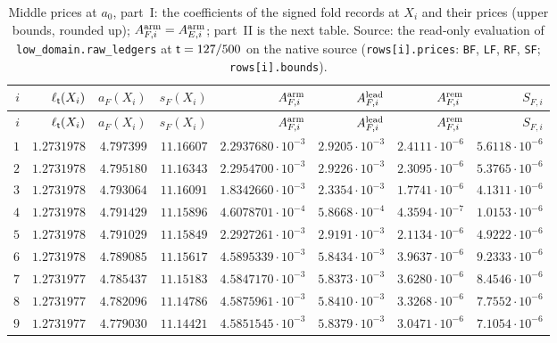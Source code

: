 {\scriptsize\setlength{\tabcolsep}{5pt}\renewcommand{\arraystretch}{0.92}
\begin{longtable}{@{}rrrrrrrr@{}}
\caption{Middle prices at $a_0$, part~I: the coefficients of the signed fold records at $X_i$ and their prices (upper bounds, rounded up); $A^{\rm arm}_{F,i}=A^{\rm arm}_{E,i}$; part~II is the next table. Source: the read-only evaluation of \texttt{low\_domain.raw\_ledgers} at $\mathsf t=127/500$ on the native source (\texttt{rows[i].prices}: \texttt{BF}, \texttt{LF}, \texttt{RF}, \texttt{SF}; \texttt{rows[i].bounds}).}\label{tab:data:prices}\\
\toprule
$i$ & $\ell_\mathsf t(X_i)$ & $a_F(X_i)$ & $s_F(X_i)$ & $A^{\rm arm}_{F,i}$ & $A^{\rm lead}_{F,i}$ & $A^{\rm rem}_{F,i}$ & $S_{F,i}$\\
\midrule
\endfirsthead
\toprule
$i$ & $\ell_\mathsf t(X_i)$ & $a_F(X_i)$ & $s_F(X_i)$ & $A^{\rm arm}_{F,i}$ & $A^{\rm lead}_{F,i}$ & $A^{\rm rem}_{F,i}$ & $S_{F,i}$\\
\midrule
\endhead
\bottomrule
\endfoot
$1$ & $1.2731978$ & $4.797399$ & $11.16607$ & $2.2937680\cdot10^{-3}$ & $2.9205\cdot10^{-3}$ & $2.4111\cdot10^{-6}$ & $5.6118\cdot10^{-6}$\\
$2$ & $1.2731978$ & $4.795180$ & $11.16343$ & $2.2954700\cdot10^{-3}$ & $2.9226\cdot10^{-3}$ & $2.3095\cdot10^{-6}$ & $5.3765\cdot10^{-6}$\\
$3$ & $1.2731978$ & $4.793064$ & $11.16091$ & $1.8342660\cdot10^{-3}$ & $2.3354\cdot10^{-3}$ & $1.7741\cdot10^{-6}$ & $4.1311\cdot10^{-6}$\\
$4$ & $1.2731978$ & $4.791429$ & $11.15896$ & $4.6078701\cdot10^{-4}$ & $5.8668\cdot10^{-4}$ & $4.3594\cdot10^{-7}$ & $1.0153\cdot10^{-6}$\\
$5$ & $1.2731978$ & $4.791029$ & $11.15849$ & $2.2927261\cdot10^{-3}$ & $2.9191\cdot10^{-3}$ & $2.1134\cdot10^{-6}$ & $4.9222\cdot10^{-6}$\\
$6$ & $1.2731978$ & $4.789085$ & $11.15617$ & $4.5895339\cdot10^{-3}$ & $5.8434\cdot10^{-3}$ & $3.9637\cdot10^{-6}$ & $9.2333\cdot10^{-6}$\\
$7$ & $1.2731977$ & $4.785437$ & $11.15183$ & $4.5847170\cdot10^{-3}$ & $5.8373\cdot10^{-3}$ & $3.6280\cdot10^{-6}$ & $8.4546\cdot10^{-6}$\\
$8$ & $1.2731977$ & $4.782096$ & $11.14786$ & $4.5875961\cdot10^{-3}$ & $5.8410\cdot10^{-3}$ & $3.3268\cdot10^{-6}$ & $7.7552\cdot10^{-6}$\\
$9$ & $1.2731977$ & $4.779030$ & $11.14421$ & $4.5851545\cdot10^{-3}$ & $5.8379\cdot10^{-3}$ & $3.0471\cdot10^{-6}$ & $7.1054\cdot10^{-6}$\\

\end{longtable}}
